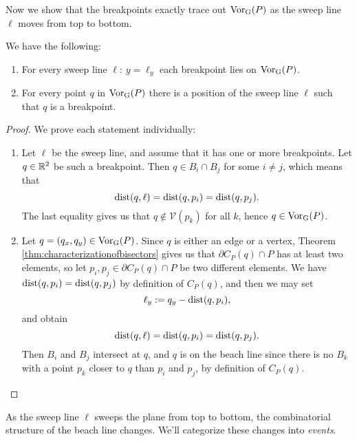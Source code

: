 Now we show that the breakpoints exactly trace out $\operatorname{Vor_{G}}(P)$ as the sweep line $\ell$ moves from top to bottom.
\begin{prop}
We have the following:
\begin{enumerate}[{(}i{)}]
\item For every sweep line $\ell$: $y = \ell_y$ each breakpoint lies on $\operatorname{Vor_{G}}(P)$.
\item For every point $q$ in $\operatorname{Vor_{G}}(P)$ there is a position of the sweep line $\ell$ such that $q$ is a breakpoint.
\end{enumerate}
\end{prop}
\begin{proof}
We prove each statement individually:
\begin{enumerate}[{(}i{):}]
    \item Let $\ell$ be the sweep line, and assume that it has one or more breakpoints. Let $q \in \mathbb{R}^2$ be such a breakpoint. Then $q \in B_i \cap B_j$ for some $i \ne j$, which means that
    \[
        \operatorname{dist}(q, \ell) = \operatorname{dist}(q, p_i) = \operatorname{dist}(q, p_j).
    \]
    The last equality gives us that $q \not\in \mathcal{V}(p_k)$ for all $k$, hence $q \in \operatorname{Vor_{G}}(P)$.
    \item Let $q = (q_x, q_y) \in \operatorname{Vor_{G}}(P)$. Since $q$ is either an edge or a vertex, Theorem \ref{thm:characterizationofbisectors} gives us that $\partial C_P(q) \cap P$ has at least two elements, so let $p_i, p_j \in \partial C_P(q) \cap P$ be two different elements. We have $\operatorname{dist}(q, p_i) = \operatorname{dist}(q, p_j)$ by definition of $C_P(q)$, and then we may set
    \[
        \ell_y := q_y - \operatorname{dist}(q, p_i),
    \]
    and obtain
    \[
        \operatorname{dist}(q, \ell) = \operatorname{dist}(q, p_i) = \operatorname{dist}(q, p_j).
    \]
    Then $B_i$ and $B_j$ intersect at $q$, and $q$ is on the beach line since there is no $B_k$ with a point $p_k$ closer to $q$ than $p_i$ and $p_j$, by definition of $C_P(q)$.
\end{enumerate}
\end{proof}
As the sweep line $\ell$ sweeps the plane from top to bottom, the combinatorial structure of the beach line changes. We'll categorize these changes into \emph{events}.

